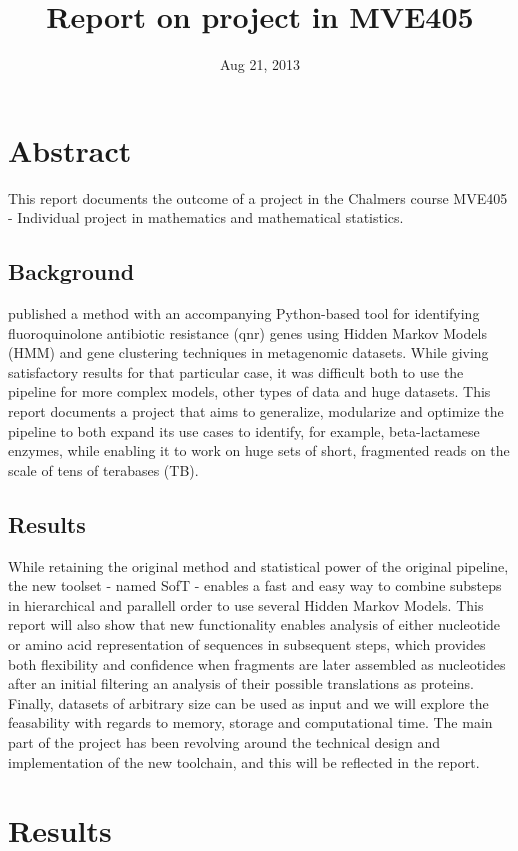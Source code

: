 \documentclass[a4paper,12pt]{article}
\title {Report on project in MVE405}
\date {Aug 21, 2013}
\begin{document}
\maketitle

\section{Abstract}
This report documents the outcome of a project in the Chalmers course MVE405 - Individual project in mathematics and mathematical statistics.

\subsection{Background}
\textcite{Boulund} published a method with an accompanying Python-based tool for identifying fluoroquinolone antibiotic resistance (qnr) genes using Hidden Markov Models (HMM) and gene clustering techniques in metagenomic datasets. While giving satisfactory results for that particular case, it was difficult both to use the pipeline for more complex models, other types of data and huge datasets. This report documents a project that aims to generalize, modularize and optimize the pipeline to both expand its use cases to identify, for example, beta-lactamese enzymes, while enabling it to work on huge sets of short, fragmented reads on the scale of tens of terabases (TB).

\subsection{Results}
While retaining the original method and statistical power of the original pipeline, the new toolset - named SofT - enables a fast and easy way to combine substeps in hierarchical and parallell order to use several Hidden Markov Models. This report will also show that new functionality enables analysis of either nucleotide or amino acid representation of sequences in subsequent steps, which provides both flexibility and confidence when fragments are later assembled as nucleotides after an initial filtering an analysis of their possible translations as proteins. Finally, datasets of arbitrary size can be used as input and we will explore the feasability with regards to memory, storage and computational time. The main part of the project has been revolving around the technical design and implementation of the new toolchain, and this will be reflected in the report.

\section{Results}
\end{document}
